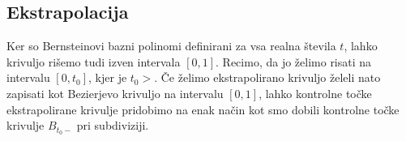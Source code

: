 \documentclass[isrm2, tisk]{fmfdelo}
\newcommand{\p}{\mathbf{p}}
\begin{document}
%
%

    \subsection{Ekstrapolacija}
    Ker so Bernsteinovi bazni polinomi definirani za vsa realna števila $t$, lahko krivuljo rišemo tudi izven intervala $[0,1]$.
    Recimo, da jo želimo risati na intervalu $[0,t_0]$, kjer je $t_0>$.
    Če želimo ekstrapolirano krivuljo želeli nato zapisati kot Bezierjevo krivuljo na intervalu $[0,1]$, lahko kontrolne točke ekstrapolirane krivulje pridobimo na enak način kot smo dobili kontrolne točke krivulje $B_{t_0-}$ pri subdiviziji.
\end{document}
